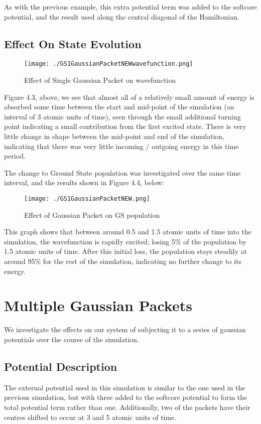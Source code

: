 As with the previous example, this extra potential term was added to the softcore potential, and the result used along the central diagonal of the Hamiltonian.

\subsection{Effect On State Evolution}

\begin{figure}[H]
          \texttt{[image: ./GS1GaussianPacketNEWwavefunction.png]}
          \centering
          \caption{Effect of Single Gaussian Packet on wavefunction}
\end{figure}

Figure 4.3, above, we see that almost all of a relatively small amount of energy is absorbed some time between the start and mid-point of the simulation (an interval of 3 atomic units of time), seen through the small additional turning point indicating a small contribution from the first excited state. There is very little change in shape between the mid-point and end of the simulation, indicating that there was very little incoming / outgoing energy in this time period.

The change to Ground State population was investigated over the same time interval, and the results shown in Figure 4.4, below:
\begin{figure}[H]
          \texttt{[image: ./GS1GaussianPacketNEW.png]}
          \centering
          \caption{Effect of Gaussian Packet on GS population}
\end{figure}

This graph shows that between around 0.5 and 1.5 atomic units of time into the simulation, the wavefunction is rapidly excited; losing 5\% of the population by 1.5 atomic units of time. After this initial loss, the population stays steadily at around 95\% for the rest of the simulation, indicating no further change to its energy.

\section{Multiple Gaussian Packets}

We investigate the effects on our system of subjecting it to a series of gaussian potentials over the course of the simulation. 

\subsection{Potential Description}
The external potential used in this simulation is similar to the one used in the previous simulation, but with three added to the softcore potential to form the total potential term rather than one. Additionally, two of the packets have their centres shifted to occur at 3 and 5 atomic units of time.

